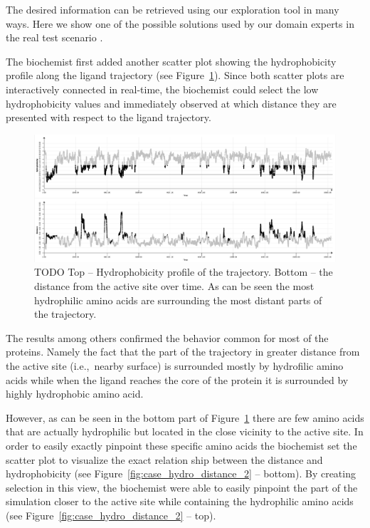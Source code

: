 \documentclass[twocolumn]{bmcart}%
\newcommand{\ie}{i.e.,~}
\begin{document}
The desired information can be retrieved using our exploration tool in many ways.
Here we show one of the possible solutions used by our domain experts in the real test scenario .

The biochemist first added another scatter plot showing the hydrophobicity profile along the ligand trajectory (see Figure~\ref{fig:case_hydro_distance}).
Since both scatter plots are interactively connected in real-time, the biochemist could select the low hydrophobicity values and immediately observed at which distance they are presented with respect to the ligand trajectory. 

\begin{figure}[htb]
	\centering
  \includegraphics[width=0.95\linewidth]{img/case_hydro_distance.png}
  \caption{\label{fig:case_hydro_distance} {\color{red}TODO} Top -- Hydrophobicity profile of the trajectory. Bottom -- the distance from the active site over time. As can be seen the most hydrophilic amino acids are surrounding the most distant parts of the trajectory.}
\end{figure} 

The results among others confirmed the behavior common for most of the proteins.
Namely the fact that the part of the trajectory in greater distance from the active site (\ie nearby surface) is surrounded mostly by hydrofilic amino acids while when the ligand reaches the core of the protein it is surrounded by highly hydrophobic amino acid.

However, as can be seen in the bottom part of Figure~\ref{fig:case_hydro_distance} there are few amino acids that are actually hydrophilic but located in the close vicinity to the active site. 
In order to easily exactly pinpoint these specific amino acids  the biochemist set the scatter plot to visualize the exact relation ship between the distance and hydrophobicity (see Figure~\ref{fig:case_hydro_distance_2} -- bottom).
By creating selection in this view, the biochemist were able to easily pinpoint the part of the simulation closer to the active site while containing the hydrophilic amino acids (see Figure~\ref{fig:case_hydro_distance_2} -- top).
\end{document}
